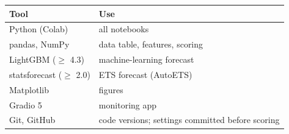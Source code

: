 \begin{tabular}{lp{8.5cm}}
\toprule
\textbf{Tool} & \textbf{Use} \\
\midrule
Python (Colab) & all notebooks \\
pandas, NumPy & data table, features, scoring \\
LightGBM ($\geq$ 4.3) \cite{lightgbm} & machine-learning forecast \\
statsforecast ($\geq$ 2.0) \cite{statsforecast} & ETS forecast (AutoETS) \\
Matplotlib & figures \\
Gradio 5 \cite{gradio} & monitoring app \\
Git, GitHub & code versions; settings committed before scoring \\
\bottomrule
\end{tabular}
